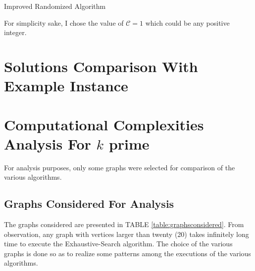 \documentclass[longpaper, english, final, times]{revdetua}
\begin{document}
			\begin{algorithm}[h]
				\caption{Improved Randomized Algorithm}
				\label{algorithm:ImprovedProbabilisticRandomized}
				\DontPrintSemicolon
				
				
				
				
			\end{algorithm}
		
		For simplicity sake, I chose the value of $\mathcal{C}=1$ which could be any positive integer.
		
	\section{\label{outline:solution-comparison} Solutions Comparison With Example Instance}
	
	
	\section{\label{outline:computational-complexities} Computational Complexities Analysis For $k$ prime}
		For analysis purposes, only some graphs were selected for comparison of the various algorithms. 
		
		\subsection{Graphs Considered For Analysis}
			The graphs considered are presented in TABLE \ref{table:graphsconsidered}. From observation, any graph with vertices larger than twenty (20) takes infinitely long time to execute the Exhaustive-Search algorithm. The choice of the various graphs is done so as to realize some patterns among the executions of the various algorithms.
			
\end{document}
